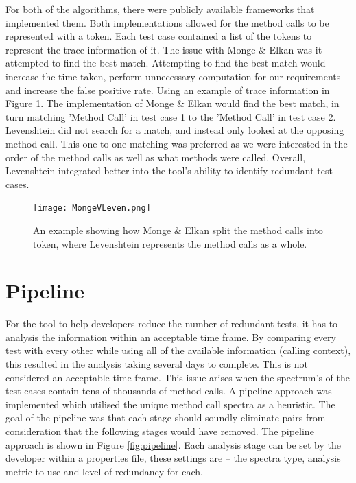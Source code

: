 For both of the algorithms, there were publicly available frameworks that implemented them. Both implementations allowed for the method calls to be represented with a token. Each test case contained a list of the tokens to represent the trace information of it. The issue with Monge \& Elkan was it attempted to find the best match. Attempting to find the best match would increase the time taken, perform unnecessary computation for our requirements and increase the false positive rate. Using an example of trace information in Figure \ref{fig:mongevleven}. The implementation of Monge \& Elkan would find the best match, in turn matching 'Method Call' in test case 1 to the 'Method Call' in test case 2. Levenshtein did not search for a match, and instead only looked at the opposing method call. This one to one matching was preferred as we were interested in the order of the method calls as well as what methods were called. Overall, Levenshtein integrated better into the tool's ability to identify redundant test cases.

\begin{figure}[h]
\begin{center}
\texttt{[image: MongeVLeven.png]}
\end{center}
\caption{An example showing how Monge \& Elkan split the method calls into token, where Levenshtein represents the method calls as a whole.}
\label{fig:mongevleven}
\end{figure}

\section{Pipeline}
\label{pipelinesection}
For the tool to help developers reduce the number of redundant tests, it has to analysis the information within an acceptable time frame. By comparing every test with every other while using all of the available information (calling context), this resulted in the analysis taking several days to complete. This is not considered an acceptable time frame. This issue arises when the spectrum's of the test cases contain tens of thousands of method calls. A pipeline approach was implemented which utilised the unique method call spectra as a heuristic. The goal of the pipeline was that each stage should soundly eliminate pairs from consideration that the following stages would have removed. The pipeline approach is shown in Figure \ref{fig:pipeline}. Each analysis stage can be set by the developer within a properties file, these settings are -- the spectra type, analysis metric to use and level of redundancy for each.

